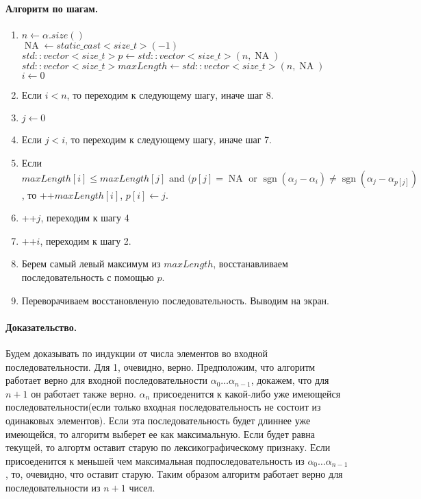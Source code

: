 \documentclass[12pt]{article}
\newcommand{\sgn}{\operatorname{sgn}}
\newcommand{\NA}{\operatorname{NA}}
\begin{document}
\paragraph{Алгоритм по шагам.}
\begin{enumerate}
    \item $ n \leftarrow \alpha.size() $ \\
          $ \NA \leftarrow static\_cast<size\_t> (-1)$ \\
          $ std::vector<size\_t> p \leftarrow std::vector<size\_t>(n, \NA) $ \\
          $ std::vector<size\_t> maxLength \leftarrow std::vector<size\_t>(n, \NA)$
          $ i \leftarrow 0 $
    \item Если $ i < n $, то переходим к следующему шагу, иначе шаг 8.
    \item $ j \leftarrow 0 $
    \item Если $ j < i $, то переходим к следующему шагу, иначе шаг 7.
    \item Если $ maxLength[i] \le maxLength[j] \mbox{   and   } (p[j] = \NA \mbox{   or   } \sgn(\alpha_j - \alpha_i) \ne \sgn(\alpha_j - \alpha_{p[j]}) $,
          то ++$maxLength[i]$, $ p[i] \leftarrow j $.
    \item ++$j$, переходим к шагу 4
    \item ++$i$, переходим к шагу 2.
    \item Берем самый левый максимум из $ maxLength $, восстанавливаем последовательность с помощью $ p $.
    \item Переворачиваем восстановленую последовательность. Выводим на экран.
\end{enumerate}


\paragraph{Доказательство.}
Будем доказывать по индукции от числа элементов во входной последовательности. Для 1, очевидно, верно.
Предположим, что алгоритм работает верно для входной последовательности $ \alpha_0 \dots \alpha_{n - 1} $,
докажем, что для $ n + 1 $ он работает также верно.
$\alpha_n$ присоеденится к какой-либо уже имеющейся последовательности(если только входная последовательность
не состоит из одинаковых элементов). Если эта последовательность будет длиннее уже имеющейся, то алгоритм
выберет ее как максимальную. Если будет равна текущей, то алгортм оставит старую по лексикографическому
признаку. Если присоеденится к меньшей чем максимальная подпоследовательность из $ \alpha_0 \dots \alpha_{n - 1} $,
то, очевидно, что оставит старую. Таким образом алгоритм работает верно для последовательности из $ n + 1 $ чисел.
\end{document}
